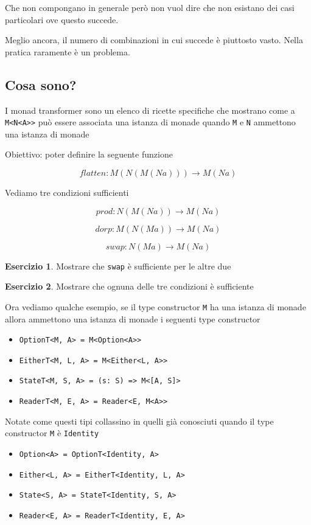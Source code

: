 \documentclass[12pt]{article}
\theoremstyle{definition}
\newtheorem{exercise}{Esercizio}[section]
\begin{document}
Che non compongano in generale però non vuol dire che non esistano dei casi particolari ove questo succede.

Meglio ancora, il numero di combinazioni in cui succede è piuttosto vasto. Nella pratica raramente è un problema.

\subsection{Cosa sono?}

I monad transformer sono un elenco di ricette specifiche che mostrano come a \texttt{M<N<A>>} può essere associata una istanza di monade
quando \texttt{M} e \texttt{N} ammettono una istanza di monade

Obiettivo: poter definire la seguente funzione

$$
flatten: M ( N ( M ( N a ) ) ) \rightarrow M ( N a )
$$

Vediamo tre condizioni sufficienti

$$
prod: N (M ( N a ) ) \rightarrow M( N a )
$$

$$
dorp: M (N ( M a ) ) \rightarrow M ( N a )
$$

$$
swap: N ( M a ) \rightarrow M ( N a )
$$

\begin{exercise}
Mostrare che \texttt{swap} è sufficiente per le altre due
\end{exercise}

\begin{exercise}
Mostrare che ognuna delle tre condizioni è sufficiente
\end{exercise}

Ora vediamo qualche esempio, se il type constructor \texttt{M} ha una istanza di monade
allora ammettono una istanza di monade i seguenti type constructor

\begin{itemize}
  \item \texttt{OptionT<M, A> = M<Option<A>>}
  \item \texttt{EitherT<M, L, A> = M<Either<L, A>>}
  \item \texttt{StateT<M, S, A> = (s: S) => M<[A, S]>}
  \item \texttt{ReaderT<M, E, A> = Reader<E, M<A>>}
\end{itemize}

Notate come questi tipi collassino in quelli già conosciuti quando il type constructor \texttt{M} è \texttt{Identity}

\begin{itemize}
  \item \texttt{Option<A> = OptionT<Identity, A>}
  \item \texttt{Either<L, A> = EitherT<Identity, L, A>}
  \item \texttt{State<S, A> = StateT<Identity, S, A>}
  \item \texttt{Reader<E, A> = ReaderT<Identity, E, A>}
\end{itemize}
\end{document}
